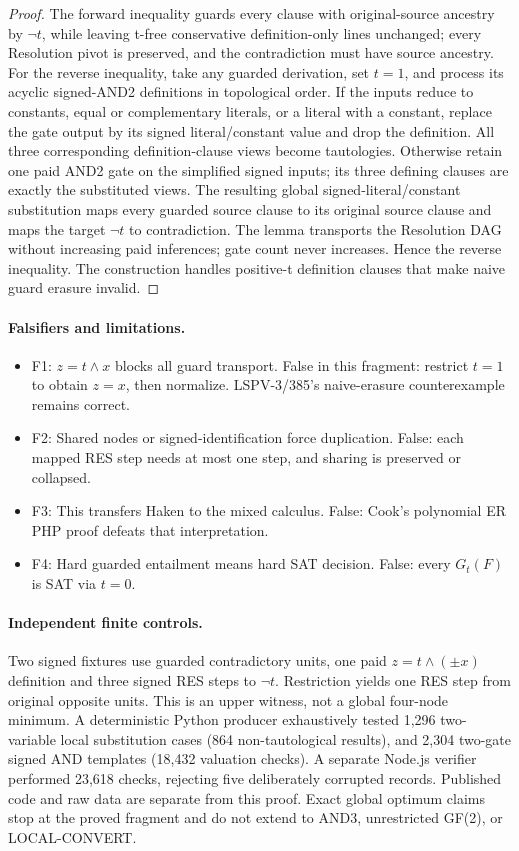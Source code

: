 \documentclass[11pt]{article}
\begin{document}
\begin{proof}
The forward inequality guards every clause with original-source ancestry by \(\neg t\), while leaving t-free conservative definition-only lines unchanged; every Resolution pivot is preserved, and the contradiction must have source ancestry. For the reverse inequality, take any guarded derivation, set \(t=1\), and process its acyclic signed-AND2 definitions in topological order. If the inputs reduce to constants, equal or complementary literals, or a literal with a constant, replace the gate output by its signed literal/constant value and drop the definition. All three corresponding definition-clause views become tautologies. Otherwise retain one paid AND2 gate on the simplified signed inputs; its three defining clauses are exactly the substituted views. The resulting global signed-literal/constant substitution maps every guarded source clause to its original source clause and maps the target \(\neg t\) to contradiction. The lemma transports the Resolution DAG without increasing paid inferences; gate count never increases. Hence the reverse inequality. The construction handles positive-t definition clauses that make naive guard erasure invalid.
\end{proof}
\paragraph{Falsifiers and limitations.}
\begin{itemize}
\item[] F1: \(z=t\land x\) blocks all guard transport. False in this fragment: restrict \(t=1\) to obtain \(z=x\), then normalize. LSPV-3/385's naive-erasure counterexample remains correct.
\item[] F2: Shared nodes or signed-identification force duplication. False: each mapped RES step needs at most one step, and sharing is preserved or collapsed.
\item[] F3: This transfers Haken to the mixed calculus. False: Cook's polynomial ER PHP proof defeats that interpretation.
\item[] F4: Hard guarded entailment means hard SAT decision. False: every \(G_t(F)\) is SAT via \(t=0\).
\end{itemize}
\paragraph{Independent finite controls.}
Two signed fixtures use guarded contradictory units, one paid \(z=t\land(\pm x)\) definition and three signed RES steps to \(\neg t\). Restriction yields one RES step from original opposite units. This is an upper witness, not a global four-node minimum. A deterministic Python producer exhaustively tested 1,296 two-variable local substitution cases (864 non-tautological results), and 2,304 two-gate signed AND templates (18,432 valuation checks). A separate Node.js verifier performed 23,618 checks, rejecting five deliberately corrupted records. Published code and raw data are separate from this proof. Exact global optimum claims stop at the proved fragment and do not extend to AND3, unrestricted GF(2), or LOCAL-CONVERT.
\end{document}
